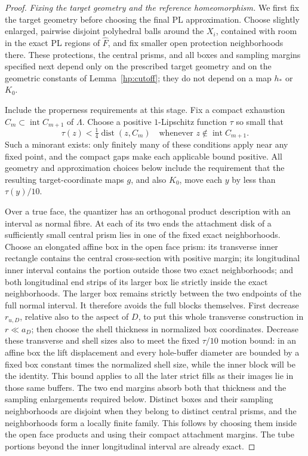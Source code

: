 \documentclass[11pt]{article}
\numberwithin{equation}{section}
\theoremstyle{definition}
\theoremstyle{remark}
\DeclareMathOperator{\dist}{dist}
\begin{document}
\begin{proof}
\emph{Fixing the target geometry and the reference homeomorphism.}
We first fix the target geometry before choosing the final PL
approximation.  Choose slightly enlarged, pairwise disjoint polyhedral
balls around the $X_i$, contained with room in the exact PL regions of
$\widehat F$, and fix smaller open protection neighborhoods there.
These protections, the central prisms, and all boxes and sampling
margins specified next depend only on the prescribed target geometry
and on the geometric constants of Lemma~\ref{hp:cutoff}; they do not
depend on a map $h_*$ or $K_0$.

Include the properness requirements at this stage.  Fix a compact
exhaustion $C_m\subset\operatorname{int}C_{m+1}$ of $\Lambda$.
Choose a positive $1$-Lipschitz function $\tau$ so small that
\[
 \tau(z)<\tfrac14\dist(z,C_m)
 \quad\text{whenever }z\notin\operatorname{int}C_{m+1}.
\]
Such a minorant exists: only finitely many of these conditions apply
near any fixed point, and the compact gaps make each applicable
bound positive.  All geometry and approximation choices below include
the requirement that the resulting target-coordinate maps $g$, and
also $K_0$, move each $y$ by less than $\tau(y)/10$.

Over a true face, the quantizer has an orthogonal product description
with an interval as normal fibre.  At each of its two ends the
attachment disk of a sufficiently small central prism lies in one of
the fixed exact neighborhoods.  Choose an elongated affine box in
the open face prism: its transverse inner rectangle contains the
central cross-section with positive margin; its longitudinal inner
interval contains the portion outside those two exact neighborhoods;
and both longitudinal end strips of its larger box lie strictly inside
the exact neighborhoods.  The larger box remains strictly between
the two endpoints of the full normal interval.  It therefore avoids
the full blocks themselves.  First decrease $r_{u,D}$, relative also
to the aspect of $D$, to put this whole transverse construction in
$r\ll a_D$; then choose the shell thickness in normalized box
coordinates.  Decrease these transverse and shell sizes also to meet
the fixed $\tau/10$ motion bound: in an affine box the lift displacement
and every hole-buffer diameter are bounded by a fixed box constant
times the normalized shell size, while the inner block will be the
identity.  This bound applies to all the later strict fills as their
images lie in those same buffers.  The two end margins absorb both
that thickness and the sampling enlargements required below.  Distinct boxes and their
sampling neighborhoods are disjoint when they belong to distinct
central prisms, and the neighborhoods form a locally finite family.
This follows by choosing them inside the open face products and
using their compact attachment margins.  The tube portions beyond
the inner longitudinal interval are already exact.


\end{proof}
\end{document}
